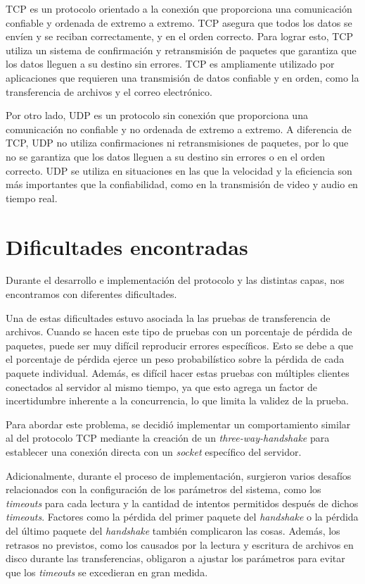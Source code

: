 \documentclass[11pt,a4paper]{article}
\begin{document}
\begin{enumerate}
    TCP es un protocolo orientado a la conexión que proporciona una comunicación confiable y ordenada de extremo a extremo. TCP asegura que todos los datos se envíen y se reciban correctamente, y en el orden correcto. Para lograr esto, TCP utiliza un sistema de confirmación y retransmisión de paquetes que garantiza que los datos lleguen a su destino sin errores. TCP es ampliamente utilizado por aplicaciones que requieren una transmisión de datos confiable y en orden, como la transferencia de archivos y el correo electrónico.
    
    Por otro lado, UDP es un protocolo sin conexión que proporciona una comunicación no confiable y no ordenada de extremo a extremo. A diferencia de TCP, UDP no utiliza confirmaciones ni retransmisiones de paquetes, por lo que no se garantiza que los datos lleguen a su destino sin errores o en el orden correcto. UDP se utiliza en situaciones en las que la velocidad y la eficiencia son más importantes que la confiabilidad, como en la transmisión de video y audio en tiempo real.
    
\end{enumerate}


\newpage

\section{Dificultades encontradas}

Durante el desarrollo e implementación del protocolo y las distintas capas, nos encontramos con diferentes dificultades.

Una de estas dificultades estuvo asociada la las pruebas de transferencia de archivos. Cuando se hacen este tipo de pruebas con un porcentaje de pérdida de paquetes, puede ser muy difícil reproducir errores específicos. Esto se debe a que el porcentaje de pérdida ejerce un peso probabilístico sobre la pérdida de cada paquete individual. Además, es difícil hacer estas pruebas con múltiples clientes conectados al servidor al mismo tiempo, ya que esto agrega un factor de incertidumbre inherente a la concurrencia, lo que limita la validez de la prueba.

Para abordar este problema, se decidió implementar un comportamiento similar al del protocolo TCP mediante la creación de un \textit{three-way-handshake} para establecer una conexión directa con un \textit{socket} específico del servidor.

Adicionalmente, durante el proceso de implementación, surgieron varios desafíos relacionados con la configuración de los parámetros del sistema, como los \textit{timeouts} para cada lectura y la cantidad de intentos permitidos después de dichos \textit{timeouts}. Factores como la pérdida del primer paquete del \textit{handshake} o la pérdida del último paquete del \textit{handshake} también complicaron las cosas. Además, los retrasos no previstos, como los causados por la lectura y escritura de archivos en disco durante las transferencias, obligaron a ajustar los parámetros para evitar que los \textit{timeouts} se excedieran en gran medida.
\end{document}
